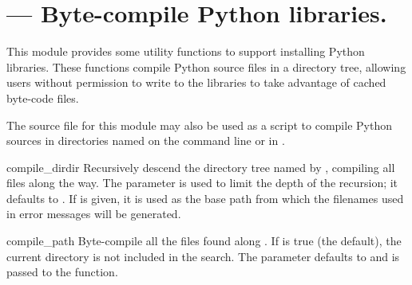 
\section{ ---
         Byte-compile Python libraries.}




This module provides some utility functions to support installing
Python libraries.  These functions compile Python source files in a
directory tree, allowing users without permission to write to the
libraries to take advantage of cached byte-code files.

The source file for this module may also be used as a script to
compile Python sources in directories named on the command line or in
.


\begin{funcdesc}{compile_dir}{dir}
  Recursively descend the directory tree named by , compiling
  all  files along the way.  The  parameter
  is used to limit the depth of the recursion; it defaults to
  .  If  is given, it is used as the base path from 
  which the filenames used in error messages will be generated.
\end{funcdesc}

\begin{funcdesc}{compile_path}{}
  Byte-compile all the  files found along .
  If  is true (the default), the current directory is 
  not included in the search.  The  parameter defaults
  to  and is passed to the  function.
\end{funcdesc}


\begin{seealso}
\end{seealso}
